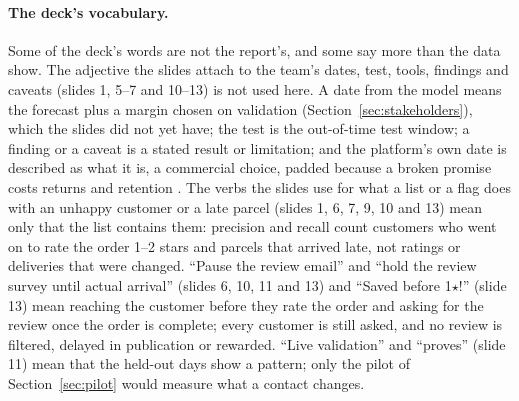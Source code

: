 \paragraph{The deck's vocabulary.} Some of the deck's words are not the
report's, and some say more than the data show. The adjective the slides attach
to the team's dates, test, tools, findings and caveats (slides 1, 5--7 and
10--13) is not used here. A date from the model means the forecast plus a margin
chosen on validation (Section~\ref{sec:stakeholders}), which the slides did not
yet have; the test is the out-of-time test window; a finding or a caveat is a
stated result or limitation; and the platform's own date is described as what it
is, a commercial choice, padded because a broken promise costs returns and
retention \citep{cui2024promise}. The verbs the slides use for what a list or a
flag does with an unhappy customer or a late parcel (slides 1, 6, 7, 9, 10 and 13) mean
only that the list contains them: precision and recall count customers who went
on to rate the order 1--2 stars and parcels that arrived late, not ratings or
deliveries that were changed. ``Pause the review email'' and ``hold the review survey until
actual arrival'' (slides 6, 10, 11 and 13) and ``Saved before 1$\star$!''
(slide 13) mean reaching the customer before they rate the order and asking for
the review once the order is complete; every customer is still asked, and no
review is filtered, delayed in publication or rewarded. ``Live validation'' and
``proves'' (slide 11) mean that the held-out days show a pattern; only the pilot
of Section~\ref{sec:pilot} would measure what a contact changes.

